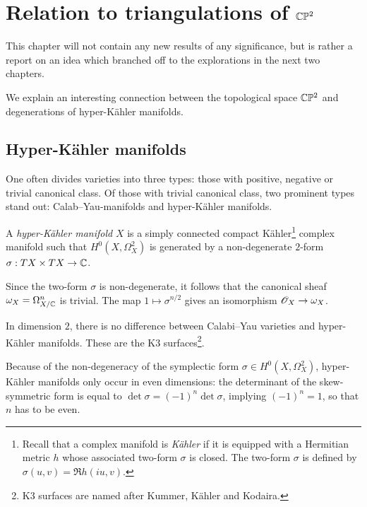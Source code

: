 \chapter{Relation to triangulations of \texorpdfstring{$\mathbb{C}\mathbb{P}^2$}{CP2}}
\label{sec:cp2triangs}

This chapter will not contain any new results of any significance, but is rather a report on an idea which branched off to the explorations in the next two chapters.

We explain an interesting connection between the topological space $\mathbb{C} \mathbb{P}^2$ and degenerations of hyper-Kähler manifolds.

\section{Hyper-Kähler manifolds} %
\label{sec:hyper_kähler_manifolds}

One often divides varieties into three types: those with positive, negative or trivial canonical class. Of those with trivial canonical class, two prominent types stand out: Calab--Yau-manifolds and hyper-Kähler manifolds.

\begin{definition}
A \emph{hyper-Kähler manifold} $X$ is a simply connected compact Kähler\footnote{Recall that a complex manifold is \emph{Kähler} if it is equipped with a Hermitian metric $h$ whose associated two-form $\sigma$ is closed. The two-form $\sigma$ is defined by $\sigma(u,v) = \Re h(iu,v)$.} complex manifold such that $H^0(X, \Omega_X^2)$ is generated by a non-degenerate $2$-form $\sigma: TX \times TX \to \mathbb{C}$.
\end{definition}

\begin{remark}
Since the two-form $\sigma$ is non-degenerate, it follows that the canonical sheaf $\omega_X=\Omega_{X/\mathbb{C}}^n$ is trivial. The map $1 \mapsto \sigma^{n/2}$ gives an isomorphism $\mathscr{O}_X \to \omega_X$. 
\end{remark}

\begin{remark}
In dimension $2$, there is no difference between Calabi--Yau varieties and hyper-Kähler manifolds. These are the K3 surfaces\footnote{K3 surfaces are named after Kummer, Kähler and Kodaira.}. 
\end{remark}

Because of the non-degeneracy of the symplectic form $\sigma \in H^0(X, \Omega_X^2)$, hyper-Kähler manifolds only occur in even dimensions: the determinant of the skew-symmetric form is equal to $\det \sigma = (-1)^n \det \sigma$, implying $(-1)^n=1$, so that $n$ has to be even.

